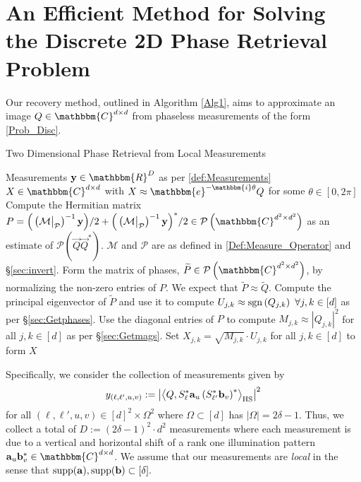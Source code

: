 \documentclass[]{spie}  %
\def \vec{\overrightarrow}
\def \a {\mathbf a}
\def \b {\mathbf b}
\def \x {\mathbf x}
\def \y {\mathbf y}
\def \C {\mathbbm{C}}
\def \HS {\rm HS}
\def \sgn {{\rm sgn}}
\def \supp {{\rm supp}}
\begin{document}
\section{An Efficient Method for Solving the Discrete 2D Phase Retrieval Problem}
\label{sec:TheMethod}
Our recovery method, outlined in Algorithm \ref{Alg1}, aims to approximate an image $Q\in \C^{d\times d}$ from phaseless measurements of the form \eqref{Prob_Disc}.    
%
%
\begin{algorithm}[htbp]
\renewcommand{\algorithmicrequire}{\textbf{Input:}}
\renewcommand{\algorithmicensure}{\textbf{Output:}}
\caption{Two Dimensional Phase Retrieval from Local Measurements}
\label{Alg1}
\begin{algorithmic}[1]
    \REQUIRE Measurements $\y\in \mathbbm{R}^D$ as per \eqref{def:Measurements}
    \ENSURE $X \in \mathbbm{C}^{d \times d}$ with $X \approx \mathbbm{e}^{-\mathbbm{i} \theta} Q$ for some $\theta \in [0, 2 \pi]$ 
    \STATE Compute the Hermitian matrix $P = \Big( \left(\mathcal{M} \big|_{\mathcal{P}}\right)^{-1} {\bf y}\Big)/2 + \Big( \left(\mathcal{M} \big|_{\mathcal{P}}\right)^{-1} {\bf y}\Big)^*/2  \in \mathcal{P}\left(\mathbbm{C}^{d^2\times d^2}\right)$ as an estimate of $\mathcal{P} \left( \vec{Q} \vec{Q}^* \right)$.  $\mathcal{M}$ and $\mathcal{P}$ are as defined in \eqref{Def:Measure_Operator} and \S\ref{sec:invert}.
    \STATE Form the matrix of phases, $\widetilde{P} \in \mathcal{P}\left(\mathbbm{C}^{d^2\times d^2}\right)$, by normalizing the non-zero entries of $P$.  We expect that $\widetilde{P} \approx \widetilde{Q}$.
    \STATE Compute the principal eigenvector of $\widetilde{P}$ and use it to compute $U_{j,k} \approx \sgn\left( Q_{j,k}\right) ~\forall j,k \in [d]$ as per \S\ref{sec:Getphases}.
    \STATE Use the diagonal entries of $P$ to compute $M_{j,k} \approx \left| Q_{j,k} \right|^2$ for all $j,k \in [d]$ as per \S\ref{sec:Getmags}.
    \STATE Set $X_{j,k} = \sqrt{M_{j,k}} \cdot U_{j,k}$ for all $j,k \in [d]$ to form $X$
    \end{algorithmic}
\end{algorithm}
%
%
%
Specifically, we consider the collection of measurements given by 
\begin{equation}
y_{(\ell,\ell',u,v)} := \left| \left\langle Q, S^*_{\ell} \a_u \left(S^*_{\ell'} \b_v \right)^* \right\rangle_{\HS} \right|^2
\label{def:Measurements}
\end{equation}
for all $(\ell,\ell',u,v) \in [d]^2 \times\Omega^2$ where $\Omega \subset [d]$ has $|\Omega| = 2\delta-1$.  Thus, we collect a total of $D := (2\delta-1)^2 \cdot d^2 $ measurements where each measurement is due to a vertical and horizontal shift of a rank one illumination pattern $\a_u \b_v^* \in \mathbbm{C}^{d \times d}$.  We assume that our measurements are \emph{local} in the sense that $\supp(\a), \supp(\b) \subset [\delta].$ %
\end{document}
